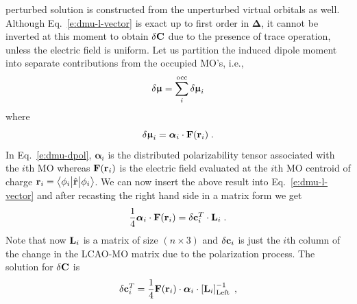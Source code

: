 \documentclass[aip,amsmath,amssymb,reprint,floatfix]{revtex4-1}
\newcommand{\tbraket}[3]{\ensuremath{\bigl\langle {#1} \bigl\lvert {#2} \bigl\lvert {#3} \bigr\rangle}}
\newcommand{\BM}[1]{\bm{#1}}
\begin{document}
perturbed solution is constructed from the unperturbed virtual orbitals as well.
Although Eq.~\eqref{e:dmu-l-vector}
is exact up to first order in ${\BM\Delta}$, it cannot be inverted at this moment to obtain $\delta {\bf C}$
due to the presence of trace operation, unless the electric field is uniform.
Let us partition the induced dipole moment into separate contributions
from the occupied MO's, i.e.,
%
\begin{equation} \label{e:dmu-part}
 \delta {\BM{\upmu}} = \sum_i^{\rm occ} \delta {\BM{\upmu}}_i
\end{equation}
%
where
%
\begin{equation} \label{e:dmu-dpol}
 \delta {\BM{\upmu}}_i = {\BM{\alpha}}_i \cdot {\bf F}({\bf r}_i) \;.
\end{equation}
%
In Eq.~\eqref{e:dmu-dpol}, ${\BM{\alpha}}_i$ is the distributed polarizability tensor
associated with the $i$th MO whereas ${\bf F}({\bf r}_i)$ is the electric field evaluated at the $i$th MO centroid of charge
${\bf r}_i = \tbraket{\phi_i}{\hat{\bf r}}{\phi_i}$.
We can now insert the above result into Eq.~\eqref{e:dmu-l-vector} 
and after recasting the right hand side in a matrix form
we get
%
\begin{equation} \label{e:dmu-l-vector-mo-transform-X}
 \frac{1}{4} {\BM{\alpha}}_i \cdot {\bf F}({\bf r}_i) 
   =
   \delta {\bf c}_i^T \cdot {\bf L}_i \;.
\end{equation}
%
Note that now ${\bf L}_i$ is a matrix of size $(n \times 3)$ and $\delta{\bf c}_i$ is just the $i$th column of the
change in the LCAO-MO matrix due to the polarization process.
%
%
The solution for $\delta {\bf C}$ is
%
\begin{equation} \label{e:mu-ind.matrix.linear.solution}
  \delta {\bf c}_i^T = \frac{1}{4}
            {\bf F}({\bf r}_i)  \cdot {\BM{\alpha}}_i \cdot 
                    \left[ {\bf L}_i  \right]^{-1}_{\rm Left} \;,
\end{equation}
\end{document}
